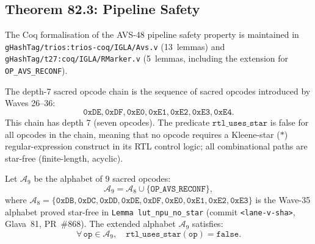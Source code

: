 \subsection{Theorem 82.3: Pipeline Safety}

The Coq formalisation of the AVS-48 pipeline safety property is
maintained in \texttt{gHashTag/trios:trios-coq/IGLA/Avs.v} (13~lemmas)
and \texttt{gHashTag/t27:coq/IGLA/RMarker.v} (5~lemmas, including the
extension for \texttt{OP\_AVS\_RECONF}).

\begin{definition}
\label{def:depth7_chain}
The depth-7 sacred opcode chain is the sequence of sacred opcodes
introduced by Waves 26--36:
\[
  \mathtt{0xDE}, \mathtt{0xDF}, \mathtt{0xE0}, \mathtt{0xE1},
  \mathtt{0xE2}, \mathtt{0xE3}, \mathtt{0xE4}.
\]
This chain has depth 7 (seven opcodes).  The predicate
$\mathtt{rtl\_uses\_star}$ is false for all opcodes in the chain,
meaning that no opcode requires a Kleene-star ($*$) regular-expression
construct in its RTL control logic; all combinational paths are
star-free (finite-length, acyclic).
\end{definition}

\begin{theorem}
\label{thm:pipeline_safety}
Let $\mathcal{A}_9$ be the alphabet of 9 sacred opcodes:
\[
  \mathcal{A}_9 = \mathcal{A}_8 \cup \{\mathtt{OP\_AVS\_RECONF}\},
\]
where $\mathcal{A}_8 = \{\mathtt{0xDB}, \mathtt{0xDC}, \mathtt{0xDD},
\mathtt{0xDE}, \mathtt{0xDF}, \mathtt{0xE0}, \mathtt{0xE1},
\mathtt{0xE2}, \mathtt{0xE3}\}$ is the Wave-35 alphabet proved
star-free in \texttt{Lemma lut\_npu\_no\_star}
(commit \texttt{<lane-v-sha>}, Glava~81, PR~\#868).
The extended alphabet $\mathcal{A}_9$ satisfies:
\[
  \forall\, \mathtt{op} \in \mathcal{A}_9,\quad
  \mathtt{rtl\_uses\_star}(\mathtt{op}) = \mathtt{false}.
\]
\end{theorem}

